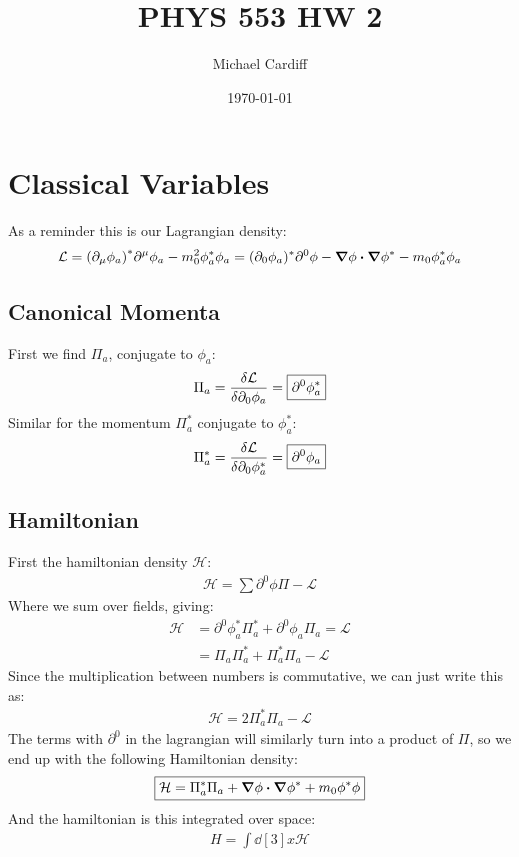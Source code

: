 \documentclass[12pt]{article}
\title{\vspace{-3em}PHYS 553 HW 2}
\author{Michael Cardiff}
\date{\today}
\renewcommand{\L}{\mathcal{L}}
\renewcommand{\H}{\mathcal{H}}
\newcommand{\D}{\partial}
\newcommand{\phis}{\phi^*}
\begin{document}
\maketitle

\section{Classical Variables}
As a reminder this is our Lagrangian density:
\begin{align*}
  \L=\qty(\D_\mu\phi_a)^*\D^\mu\phi_a-m_0^2\phis_a\phi_a=
  (\D_0\phi_a)^*\D^0\phi - \grad{\phi}\vdot\grad{\phis}-m_0\phis_a\phi_a
\end{align*}
\subsection{Canonical Momenta}
First we find $\Pi_a$, conjugate to $\phi_a$:
\begin{align*}
  \Pi_a=\fdv{\L}{\D_0\phi_a}=\boxed{\D^0\phis_a}
\end{align*}
Similar for the momentum $\Pi^*_a$ conjugate to $\phis_a$:
\begin{align*}
  \Pi^*_a=\fdv{\L}{\D_0\phis_a}=\boxed{\D^0\phi_a}
\end{align*}
\subsection{Hamiltonian}
First the hamiltonian density $\H$:
\begin{align*}
  \H = \sum \D^0\phi\Pi - \L
\end{align*}
Where we sum over fields, giving:
\begin{align*}
  \H &=  \D^0\phis_a\Pi^*_a+\D^0\phi_a\Pi_a=\L\\
  &=\Pi_a\Pi^*_a+\Pi^*_a\Pi_a-\L
\end{align*}
Since the multiplication between numbers is commutative, we can just write this as:
\begin{align*}
  \H = 2\Pi^*_a\Pi_a-\L
\end{align*}
The terms with $\D^0$ in the lagrangian will similarly turn into a product of $\Pi$, so we end up with the following Hamiltonian density:
\begin{align*}
  \boxed{\H=\Pi^*_a\Pi_a+\grad{\phi}\vdot\grad{\phis}+m_0\phis\phi}
\end{align*}
And the hamiltonian is this integrated over space:
\begin{align*}
  \boxed{H=\int\dd[3]{x}\H}
\end{align*}
\end{document}
